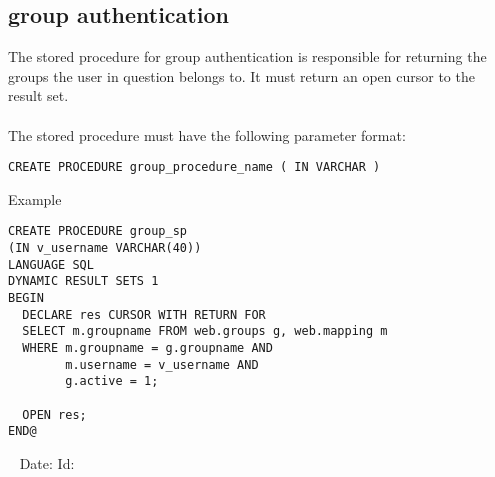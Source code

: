 \documentclass[11pt,letterpaper]{article}
\newcommand{\showtext}[2]{
\ifdata
#1#2
\fi
}
\begin{document}
\begin{appendix}
\subsection{group authentication} \label{groupsp}
The stored procedure for group authentication is responsible for returning the groups the user in question belongs to. It must return an open cursor to the result set.\\
\\
The stored procedure must have the following parameter format:
\begin{verbatim}
CREATE PROCEDURE group_procedure_name ( IN VARCHAR )
\end{verbatim}
Example
\begin{verbatim}
CREATE PROCEDURE group_sp
(IN v_username VARCHAR(40))
LANGUAGE SQL
DYNAMIC RESULT SETS 1
BEGIN
  DECLARE res CURSOR WITH RETURN FOR
  SELECT m.groupname FROM web.groups g, web.mapping m
  WHERE m.groupname = g.groupname AND
        m.username = v_username AND
        g.active = 1;

  OPEN res;
END@
\end{verbatim}

\end{appendix}

\begin{center}
\vspace{\fill}\ \newline
{\tiny \rm \showtext{Date: }\CommitDateTimeTz{} }
{\tiny \rm \showtext{Id: }\CommitHash{} }
\end{center}
\end{document}
